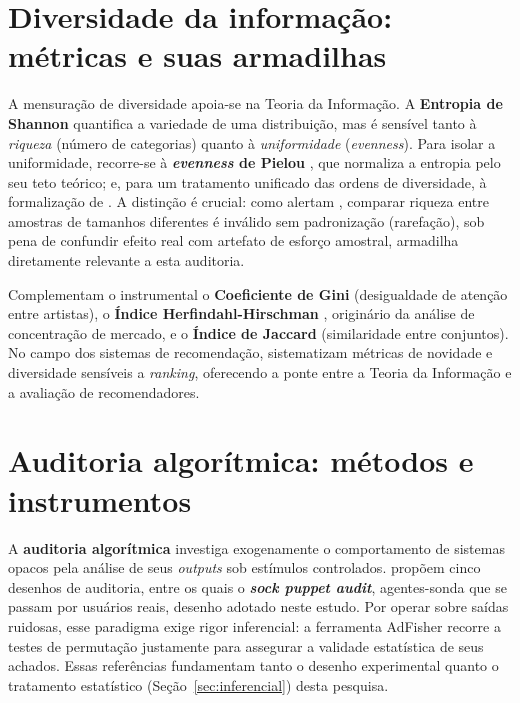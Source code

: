 \documentclass[12pt, %
openright,
oneside, %
a4paper,    %
english,   %
brazil]{facom-ufu-abntex2}
\begin{document}
\section{Diversidade da informação: métricas e suas armadilhas}

A mensuração de diversidade apoia-se na Teoria da Informação. A \textbf{Entropia
de Shannon} \cite{shannon1948mathematical} quantifica a variedade de uma
distribuição, mas é sensível tanto à \emph{riqueza} (número de categorias)
quanto à \emph{uniformidade} (\emph{evenness}). Para isolar a uniformidade,
recorre-se à \textbf{\emph{evenness} de Pielou} \cite{pielou1966measurement},
que normaliza a entropia pelo seu teto teórico; e, para um tratamento unificado
das ordens de diversidade, à formalização de . A
distinção é crucial: como alertam , comparar
riqueza entre amostras de tamanhos diferentes é inválido sem padronização
(rarefação), sob pena de confundir efeito real com artefato de esforço amostral,
armadilha diretamente relevante a esta auditoria.

Complementam o instrumental o \textbf{Coeficiente de Gini} (desigualdade de
atenção entre artistas), o \textbf{Índice Herfindahl-Hirschman}
\cite{rhoades1993herfindahl}, originário da análise de concentração de mercado, e
o \textbf{Índice de Jaccard} (similaridade entre conjuntos). No campo dos
sistemas de recomendação,  sistematizam métricas de
novidade e diversidade sensíveis a \emph{ranking}, oferecendo a ponte entre a
Teoria da Informação e a avaliação de recomendadores.

\section{Auditoria algorítmica: métodos e instrumentos}

A \textbf{auditoria algorítmica} investiga exogenamente o comportamento de
sistemas opacos pela análise de seus \emph{outputs} sob estímulos controlados.
 propõem cinco desenhos de auditoria, entre os
quais o \textbf{\emph{sock puppet audit}}, agentes-sonda que se passam por
usuários reais, desenho adotado neste estudo. Por operar sobre saídas
ruidosas, esse paradigma exige rigor inferencial: a ferramenta AdFisher
\cite{datta2015automated} recorre a testes de permutação justamente para
assegurar a validade estatística de seus achados. Essas referências fundamentam
tanto o desenho experimental quanto o tratamento estatístico
(Seção~\ref{sec:inferencial}) desta pesquisa.
\end{document}
